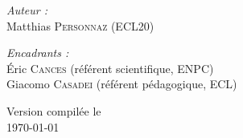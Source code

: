 \documentclass[svgnames,dvipsnames,a4paper,10pt,french]{report}
\begin{document}
\begin{titlepage}
\begin{center}
\noindent
\begin{minipage}{0.4\textwidth}
  \begin{flushleft} \large
    \emph{Auteur :}\\
    \vspace{.3cm}
    Matthias \textsc{Personnaz} (ECL20)
  \end{flushleft}
\end{minipage}%
\begin{minipage}{0.6\textwidth}
  \begin{flushright} \large
    \emph{Encadrants :} \\
    \vspace{.3cm}
    Éric    \textsc{Cances} (référent scientifique, ENPC) \\
    Giacomo \textsc{Casadei} (référent pédagogique, ECL)
  \end{flushright}
\end{minipage}



\vfill
{} 
{\large Version compilée le\\ \today}

\end{center}
\end{titlepage}
\thispagestyle{empty}

\renewcommand*\contentsname{Sommaire}
\renewcommand{\listalgorithmname}{Liste des algorithmes}
\end{document}
